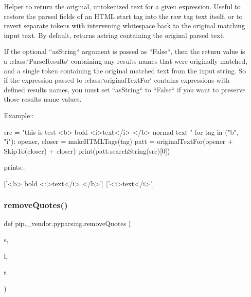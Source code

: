 \begin{DoxyVerb}Helper to return the original, untokenized text for a given
expression.  Useful to restore the parsed fields of an HTML start
tag into the raw tag text itself, or to revert separate tokens with
intervening whitespace back to the original matching input text. By
default, returns astring containing the original parsed text.

If the optional ``asString`` argument is passed as
``False``, then the return value is
a :class:`ParseResults` containing any results names that
were originally matched, and a single token containing the original
matched text from the input string.  So if the expression passed to
:class:`originalTextFor` contains expressions with defined
results names, you must set ``asString`` to ``False`` if you
want to preserve those results name values.

Example::

    src = "this is test <b> bold <i>text</i> </b> normal text "
    for tag in ("b", "i"):
        opener, closer = makeHTMLTags(tag)
        patt = originalTextFor(opener + SkipTo(closer) + closer)
        print(patt.searchString(src)[0])

prints::

    ['<b> bold <i>text</i> </b>']
    ['<i>text</i>']
\end{DoxyVerb}
 \mbox{\label{namespacepip_1_1__vendor_1_1pyparsing_a0c37699ef055cd4c69d2826529e92d46}} 
\subsubsection{\texorpdfstring{remove\+Quotes()}{removeQuotes()}}
{\footnotesize\ttfamily def pip.\+\_\+vendor.\+pyparsing.\+remove\+Quotes (\begin{DoxyParamCaption}\item[{}]{s,  }\item[{}]{l,  }\item[{}]{t }\end{DoxyParamCaption})}

